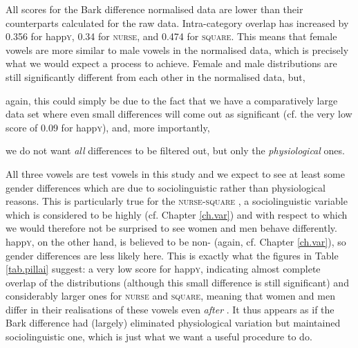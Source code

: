 All  scores for the Bark difference normalised data are lower than their counterparts calculated for the raw data.
Intra-category overlap has increased by 0.356 for happ\textsc{y}, 0.34 for \textsc{nurse}, and 0.474 for \textsc{square}.
This means that female vowels are more similar to male vowels in the normalised data, which is precisely what we would expect a   process to achieve.
Female and male distributions are still significantly different from each other in the normalised data, but,
\begin{inparaenum}[(a)]
	\item again, this could simply be due to the fact that we have a comparatively large data set where even small differences will come out as significant (cf. the very low  score of 0.09 for happ\textsc{y}), and, more importantly,
	\item we do not want \emph{all} differences to be filtered out, but only the \emph{physiological} ones.
\end{inparaenum}

All three vowels are test vowels in this study and we expect to see at least some gender differences which are due to sociolinguistic rather than physiological reasons.
This is particularly true for the \textsc{nurse-square} , a sociolinguistic variable which is considered to be highly  (cf. Chapter \ref{ch.var}) and with respect to which we would therefore not be surprised to see women and men behave differently.
happ\textsc{y}, on the other hand, is believed to be non- (again, cf. Chapter \ref{ch.var}), so gender differences are less likely here.
This is exactly what the figures in Table \ref{tab.pillai} suggest: a very low  score for happ\textsc{y}, indicating almost complete overlap of the distributions (although this small difference is still significant) and considerably larger ones for \textsc{nurse} and \textsc{square}, meaning that women and men differ in their realisations of these vowels even \emph{after} .
It thus appears as if the Bark difference  had (largely) eliminated physiological variation but maintained sociolinguistic one, which is just what we want a useful  procedure to do.


